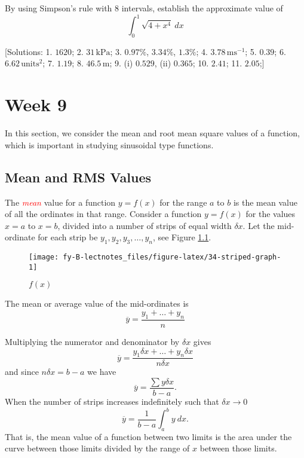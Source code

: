 \documentclass[
  11pt,
  oneside]{book}
\newcommand{\slide}{}
\theoremstyle{definition}
\theoremstyle{definition}
\theoremstyle{definition}
\theoremstyle{definition}
\theoremstyle{remark}
\begin{document}
By using Simpson's rule with 8 intervals, establish the approximate value of
\[
\int_0^1\sqrt{4+x^4}\ dx
\]

{[}Solutions:
1. \(1620\);
2. \(31\,\text{kPa}\);
3. \(0.97\%\), \(3.34\%\), \(1.3\%\);
4. \(3.78\,\text{ms}^{-1}\);
5. \(0.39\);
6. \(6.62\,\text{units}^2\);
7. \(1.19\);
8. \(46.5\,\text{m}\);
9. (i) \(0.529\), (ii) \(0.365\);
10. \(2.41\);
11. \(2.05\);{]}

\chapter{Week 9}\label{week-nine}

In this section, we consider the mean and root mean square values of a function, which is important in studying sinusoidal type functions.

\slide

\section{Mean and RMS Values}\label{mean-and-rms-values}

The \textcolor{red}{\em mean} value for a function \(y = f(x)\) for the range \(a\) to \(b\) is the mean value of all the ordinates in that range. Consider a function \(y = f(x)\) for the values \(x = a\) to \(x = b\), divided into a number of strips of equal width \(\delta x\). Let the mid-ordinate for each strip be \(y_1, y_2, y_3,\ldots,y_n\), see Figure \ref{fig:34-striped-graph}.

\begin{figure}

{\centering \texttt{[image: fy-B-lectnotes\_files/figure-latex/34-striped-graph-1]} 

}

\caption{$f(x)$}\label{fig:34-striped-graph}
\end{figure}

The mean or average value of the mid-ordinates is
\[
\overline y=\frac{y_1+\ldots+y_n}{n}
\]
\slide

Multiplying the numerator and denominator by \(\delta x\) gives
\[
\overline y=\frac{y_1\delta x+\ldots+y_n\delta x}{n\delta x}
\]
and since \(n\delta x = b - a\) we have
\[
\overline y = \frac{\sum y\delta x}{b-a}.
\]
When the number of strips increases indefinitely such that \(\delta x \to 0\)
\[
\overline y = \frac{1}{b-a}\int_a^b y\ dx.
\]
That is, the mean value of a function between two limits is the area under the curve between those limits divided by the range of \(x\) between those limits.
\end{document}
